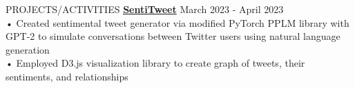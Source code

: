 \documentclass{resume} %
\begin{document}
\begin{rSection}{PROJECTS/ACTIVITIES}
\textbf {\href{https://github.com/aminoa/sentitweet/}{SentiTweet}} \hfill March 2023 - April 2023 \\
• Created sentimental tweet generator via modified PyTorch PPLM library with GPT-2 to simulate conversations between Twitter users using natural language generation\\
• Employed D3.js visualization library to create graph of tweets, their sentiments, and relationships 

\end{rSection}
\end{document}
